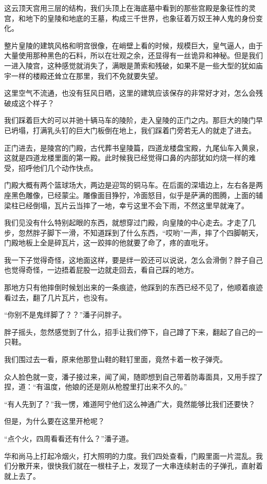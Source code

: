 这云顶天宫用三层的结构，我们头顶上在海底墓中看到的那些宫殿是象征性的灵宫，和地下的皇陵和地底的王墓，构成三千世界，也象征着万奴王神人鬼的身份变化。

整片皇陵的建筑风格和明宫很像，在峭壁上看的时候，规模巨大，皇气逼人，由于大量使用那种黑色的石料，所以在壮观之余，还显得有一丝诡异和神秘。但是我们一进入陵宫，这种感觉就消失了，满眼是萧索和残破，如果不是一些大型的犹如庙宇一样的楼殿还耸立在那里，我们不免就要失望。

这里空气不流通，也没有狂风日晒，这里的建筑应该保存的非常好才对，怎么会残破成这个样子？

我们踩着巨大的可以并驰十辆马车的陵阶，走入皇陵的正门之内。那巨大的陵门早已坍塌，打满乳头钉的巨大门板倒在地上，我们踩着门旁若无人的就走了进去。

正门进去，是陵宫的门殿，古代葬书皇陵篇，四道龙楼盘宝殿，九尾仙车入黄泉，这就是四道龙楼里面的第一殿。此时候我已经觉得口鼻的内部犹如灼烧一样的难受，招呼他们几个动作快点。

门殿大概有两个篮球场大，两边是迎驾的铜马车。在后面的深墙边上，左右各是两座黑色雕像，已经蒙尘。雕像面目狰狞，冷面怒目，似乎是萨满的图腾，上面的辅梁柱已经倒塌，瓦片云当摔了一地，幸亏这里不会下雨，不然这里早就淹了。

我们见没有什么特别起眼的东西，就想穿过门殿，向皇陵的中心走去。才走了几步，忽然胖子脚下一滑，不知道踩到了什么东西，“哎哟”一声，摔了个四脚朝天，门殿地板上全是碎瓦片，这一跤摔的他就要了命了，疼的直吡牙。

我一下子觉得奇怪，这地面这样，要是绊一跤还可以说说，怎么会滑倒？胖子自己也觉得奇怪，一边捂着屁股一边就走回去，看自己踩的地方。

那地方只有他摔倒时候划出来的一条痕迹，他踩到的东西已经不见了，他顺着痕迹看过去，翻了几片瓦片，也没有。

“你别不是鬼绊脚了？？”潘子问胖子。

胖子摇头，忽然感觉到了什么，招手让我们停下，自己蹲了下来，翻起了自己的一只鞋。

我们围过去一看，原来他那登山鞋的鞋钉里面，竟然卡着一枚子弹壳。

众人脸色就一变，潘子接过来，闻了闻，随即想到自己带着防毒面具，又用手捏了捏，道：“有温度，他娘的还是刚从枪膛里打出来不久的。”

“有人先到了？”我一愣，难道阿宁他们这么神通广大，竟然能够比我们还要快？

但是，为什么要在这里开枪呢？

“点个火，四周看看还有什么？”潘子道。

华和尚马上打起冷烟火，打大照明的力度。我们四处查看，门殿里面一片混乱。我们分散开来，很快我们就在一根柱子上，发现了一大串连续射击的子弹孔，直射着就上去了。

